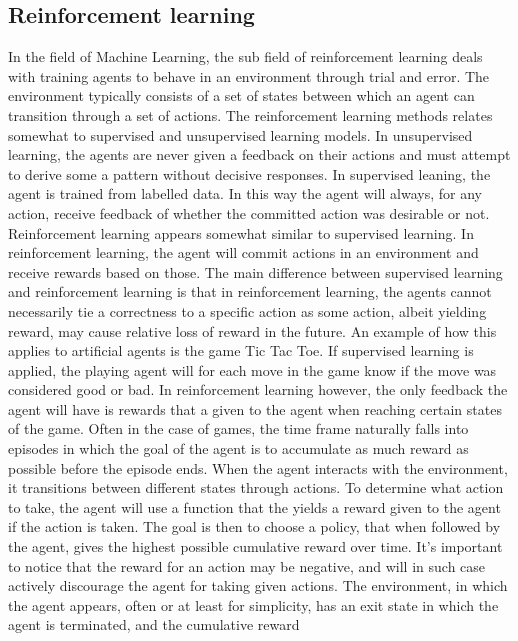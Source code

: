 \subsection{Reinforcement learning \label{RL}}

In the field of Machine Learning, the sub field of reinforcement learning
deals with training agents to behave in an environment through
trial and error. The environment typically consists of a set of states
between which an agent can transition through a set of actions.
The reinforcement learning methods relates somewhat 
to supervised and unsupervised learning models. In unsupervised 
learning, the agents are never given a feedback on their actions
and must attempt to derive some a pattern without decisive responses.
In supervised leaning, the agent is trained from labelled data.
In this way the agent will always, for any action, receive 
feedback of whether the committed action was desirable or not.
Reinforcement learning appears somewhat similar to supervised learning.
In reinforcement learning, the agent will commit actions in an environment
and receive rewards based on those. The main difference between supervised
learning and reinforcement learning is that in reinforcement learning,
the agents cannot necessarily tie a correctness 
to a specific action as some action, albeit yielding reward,
may cause relative loss of reward in the future. An example of how this applies 
to artificial agents is the game Tic Tac Toe. If supervised learning
is applied, the playing agent will for each move in the game know
if the move was considered good or bad. In reinforcement learning however,
the only feedback the agent will have is rewards that a given 
to the agent when reaching certain states of the game. 
Often in the case of games, the 
time frame naturally falls into episodes in which the 
goal of the agent is to accumulate as much reward as possible 
before the episode ends. When the agent interacts 
with the environment, it transitions between different states through 
actions. To determine what action to take, the agent will use
a function that the yields a reward given to the agent 
if the action is taken. 
The goal is then to choose a policy, that when followed by the agent,
gives the highest possible cumulative reward over time. 
It's important to notice that the reward 
for an action may be negative, and will in such case actively discourage 
the agent for taking given actions.
The environment, in which the agent appears, often 
or at least for simplicity, has an exit state
in which the agent is terminated, and the cumulative reward 
